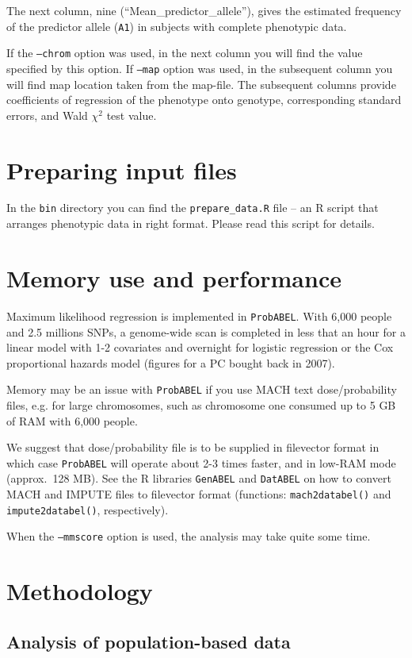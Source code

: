 \documentclass[12pt,a4paper]{article}
\newcommand{\PA}{\texttt{ProbABEL}}
\newcommand{\GA}{\texttt{GenABEL}}
\newcommand{\DA}{\texttt{DatABEL}}
\begin{document}
The next column, nine (``Mean\_predictor\_allele''), gives the estimated
frequency of the predictor allele (\texttt{A1}) in subjects with complete
phenotypic data.

If the \texttt{--chrom} option was used, in the next column you will
find the value specified by this option. If \texttt{--map} option was
used, in the subsequent column you will find map location taken from
the map-file. The subsequent columns provide coefficients of
regression of the phenotype onto genotype, corresponding standard
errors, and Wald $\chi^2$ test value.


\section{Preparing input files}
In the \texttt{bin} directory you can find the
\texttt{prepare\_data.R} file -- an R script that arranges phenotypic
data in right format. Please read this script for details.

\section{Memory use and performance}
Maximum likelihood regression is implemented in
\PA{}. With 6,000 people and 2.5 millions SNPs, a
genome-wide scan is completed in less that an hour for a linear model
with 1-2 covariates and overnight for logistic regression or the Cox
proportional hazards model (figures for a PC bought back in 2007).

Memory may be an issue with \PA{} if you use
MACH text dose/probability files, e.g. for large chromosomes,
such as chromosome one consumed up to 5 GB of RAM with 6,000 people.

We suggest that dose/probability file is to be supplied in filevector format
in which case \PA{} will operate about 2-3 times faster, and
in low-RAM mode (approx.~128 MB). See the R libraries \GA{} and
\DA{} on how to convert MACH and IMPUTE files to
filevector format (functions: \texttt{mach2databel()} and
\texttt{impute2databel()}, respectively).

When the \texttt{--mmscore} option is used, the analysis may take
quite some time.

\section{Methodology}
\label{sec:methodology}
\subsection{Analysis of population-based data}
\end{document}
